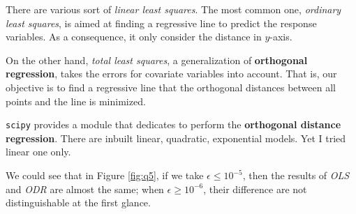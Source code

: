 \documentclass[12pt, a4paper]{article}
\begin{document}
There are various sort of \emph{linear least squares}. The most common one, \emph{ordinary least squares}, is aimed at finding a regressive line to predict the response variables. As a consequence, it only consider the distance in $y$-axis.

On the other hand, \emph{total least squares}, a generalization of \textbf{orthogonal regression}, takes the errors for covariate variables into account. That is, our objective is to find a regressive line that the orthogonal distances between all points and the line is minimized.

\texttt{scipy} provides a module that dedicates to perform the \textbf{orthogonal distance regression}. There are inbuilt linear, quadratic, exponential models. Yet I tried linear one only.

We could see that in Figure \ref{fig:q5}, if we take $\epsilon\leq10^{-5}$, then the results of \emph{OLS} and \emph{ODR} are almost the same; when $\epsilon\geq10^{-6}$, their difference are not distinguishable at the first glance.
\end{document}
